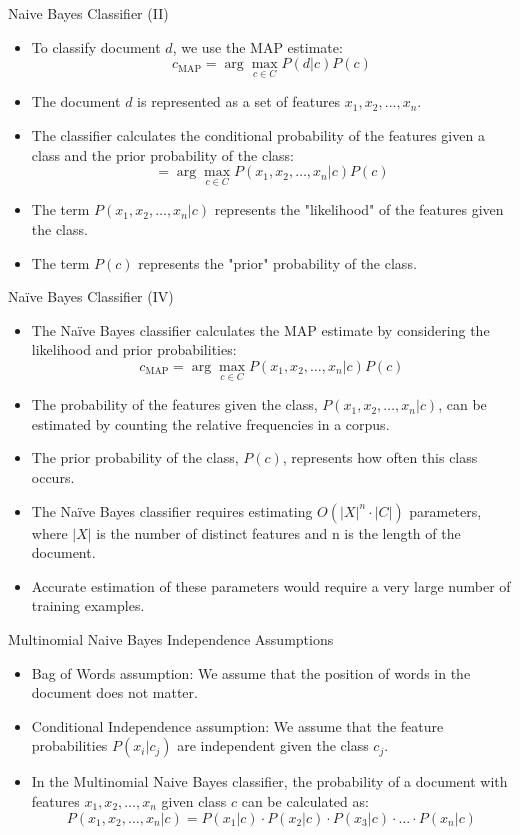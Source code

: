 \documentclass[handout]{beamer}
\begin{document}
\begin{frame}{Naive Bayes Classifier (II)}
\scriptsize
\begin{itemize}
    \item To classify document $d$, we use the MAP estimate:
    \[
    c_{\text{MAP}} = \arg\max_{c \in C} P(d | c)P(c)
    \]
    \item The document $d$ is represented as a set of features $x_1, x_2, \ldots, x_n$.
    \item The classifier calculates the conditional probability of the features given a class and the prior probability of the class:
    \[
    = \arg\max_{c \in C} P(x_1, x_2, \ldots, x_n | c)P(c)
    \]
    \item The term $P(x_1, x_2, \ldots, x_n | c)$ represents the "likelihood" of the features given the class.
    \item The term $P(c)$ represents the "prior" probability of the class.
\end{itemize}
\end{frame}

\begin{frame}{Naïve Bayes Classifier (IV)}
\scriptsize
\begin{itemize}
    \item The Naïve Bayes classifier calculates the MAP estimate by considering the likelihood and prior probabilities:
    \[
    c_{\text{MAP}} = \arg\max_{c \in C} P(x_1, x_2, \ldots, x_n | c)P(c)
    \]
    \item The probability of the features given the class, $P(x_1, x_2, \ldots, x_n | c)$, can be estimated by counting the relative frequencies in a corpus.
    \item The prior probability of the class, $P(c)$, represents how often this class occurs.
    \item The Naïve Bayes classifier requires estimating $O(|X|^n \cdot |C|)$ parameters, where $|X|$ is the number of distinct features and n is the length of the document.
    \item Accurate estimation of these parameters would require a very large number of training examples.
\end{itemize}
\end{frame}

\begin{frame}{Multinomial Naive Bayes Independence Assumptions}
\scriptsize
\begin{itemize}
    \item Bag of Words assumption: We assume that the position of words in the document does not matter.
    \item Conditional Independence assumption: We assume that the feature probabilities $P(x_i | c_j)$ are independent given the class $c_j$.
    \item In the Multinomial Naive Bayes classifier, the probability of a document with features $x_1, x_2, \ldots, x_n$ given class $c$ can be calculated as:
    \[
    P(x_1, x_2, \ldots, x_n | c) = P(x_1 | c) \cdot P(x_2 | c) \cdot P(x_3 | c) \cdot \ldots \cdot P(x_n | c)
    \]
\end{itemize}
\end{frame}
\end{document}
